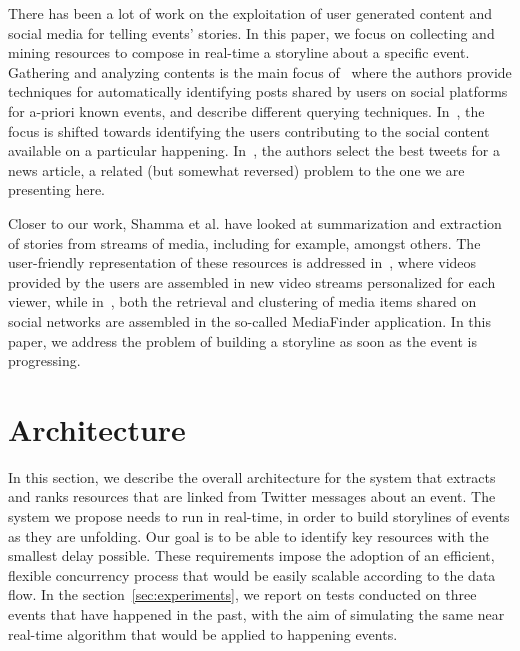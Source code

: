 \documentclass{sig-alternate-somus}
\begin{document}
There has been a lot of work on the exploitation of user generated content and social media for telling events' stories. In this paper, we focus on collecting and mining resources to compose in real-time a storyline about a specific event. Gathering and analyzing contents is the main focus of~\cite{becker:WSDM12} where the authors provide techniques for automatically identifying posts shared by users on social platforms for a-priori known events, and describe different querying techniques. In~\cite{naaman:CSCW12}, the focus is shifted towards identifying the users contributing to the social content available on a particular happening. In~\cite{stajner:KDD13}, the authors select the best tweets for a news article, a related (but somewhat reversed) problem to the one we are presenting here.

Closer to our work, Shamma et al. \cite{Shamma:ICWSM10} have looked at summarization and extraction of stories from streams of media, including for example, \cite{Lin:ICME09,Shamma:CSCW11} amongst others. The user-friendly representation of these resources is addressed in~\cite{cesar:HT11}, where videos provided by the users are assembled in new video streams personalized for each viewer, while in~\cite{Rizzo:SAM12}, both the retrieval and clustering of media items shared on social networks are assembled in the so-called MediaFinder application. In this paper, we address the problem of building a storyline as soon as the event is progressing.


\section{Architecture}
\label{sec:architecture}
In this section, we describe the overall architecture for the system that extracts and ranks resources that are linked from Twitter messages about an event. The system we propose needs to run in real-time, in order to build storylines of events as they are unfolding. Our goal is to be able to identify key resources with the smallest delay possible. These requirements impose the adoption of an efficient, flexible concurrency process that would be easily scalable according to the data flow. In the section~\ref{sec:experiments}, we report on tests conducted on three events that have happened in the past, with the aim of simulating the same near real-time algorithm that would be applied to happening events.
\end{document}
